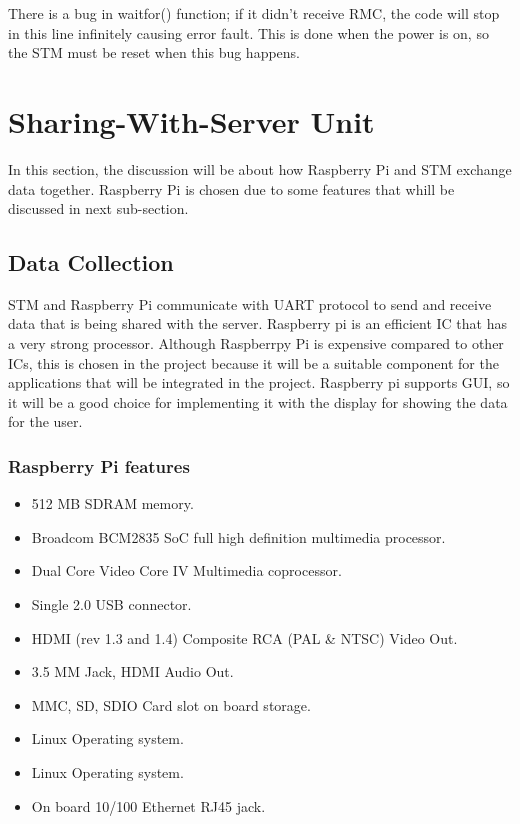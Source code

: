 There is a bug in waitfor() function; if it didn't receive RMC, the code will stop in this line infinitely causing error fault. This is done when the power is on, so the STM must be reset when this bug happens.

\section{Sharing-With-Server Unit}
In this section, the discussion will be about how Raspberry Pi and STM exchange data together. Raspberry Pi is chosen due to some features that whill be discussed in next sub-section.

\subsection{Data Collection}

STM and Raspberry Pi communicate with UART protocol to send and receive data that is being shared with the server. Raspberry pi is an efficient IC that has a very strong processor. Although Raspberrpy Pi is expensive compared to other ICs, this is chosen in the project because it will be a suitable component for the applications that will be integrated in the project. Raspberry pi supports GUI, so it will be a good choice for implementing it with the display for showing the data for the user.

\subsubsection{Raspberry Pi features}
\begin{itemize}
    \item 512 MB SDRAM memory.
    \item Broadcom BCM2835 SoC full high definition  multimedia processor.
    \item Dual Core Video Core IV Multimedia coprocessor.
    \item Single 2.0 USB connector.
    \item HDMI (rev 1.3 and 1.4) Composite RCA (PAL & NTSC) Video Out.
    \item 3.5 MM Jack, HDMI Audio Out.
    \item MMC, SD, SDIO Card slot on board storage.
    \item Linux Operating system.
    \item Linux Operating system.
    \item  On board 10/100 Ethernet RJ45 jack.
\end{itemize}
    
